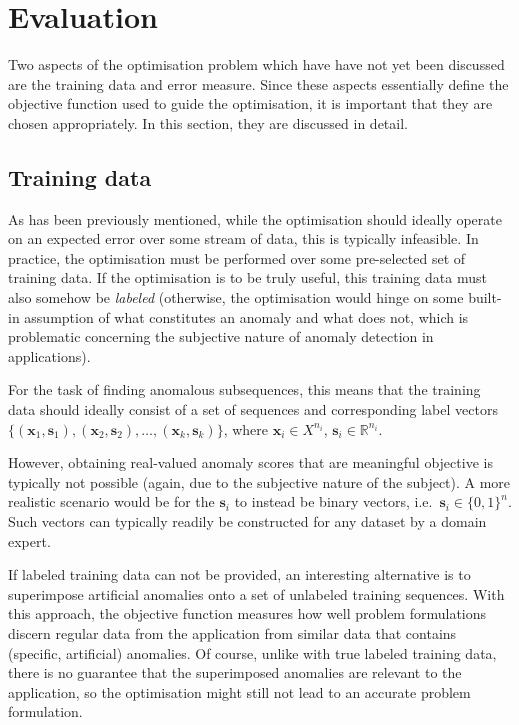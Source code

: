 \section{Evaluation}
\label{ch:evaluation}

Two aspects of the optimisation problem which have have not yet been discussed are the training data and error measure. Since these aspects essentially define the objective function used to guide the optimisation, it is important that they are chosen appropriately. In this section, they are discussed in detail.

\subsection{Training data}
\label{sect:evaluation_data}

As has been previously mentioned, while the optimisation should ideally operate on an expected error over some stream of data, this is typically infeasible. In practice, the optimisation must be performed over some pre-selected set of training data. If the optimisation is to be truly useful, this training data must also somehow be \emph{labeled} (otherwise, the optimisation would hinge on some built-in assumption of what constitutes an anomaly and what does not, which is problematic concerning the subjective nature of anomaly detection in applications).

For the task of finding anomalous subsequences, this means that the training data should ideally consist of a set of sequences and corresponding label vectors $\{(\mathbf{x}_1, \mathbf{s}_1), (\mathbf{x}_2, \mathbf{s}_2), \dots, (\mathbf{x}_k, \mathbf{s}_k)\}$, where $\mathbf{x}_i \in X^{n_i}$, $\mathbf{s}_i \in \mathbb{R}^{n_i}$.

However, obtaining real-valued anomaly scores that are meaningful objective is typically not possible (again, due to the subjective nature of the subject). A more realistic scenario would be for the $\mathbf{s}_i$ to instead be binary vectors, i.e.\ $\mathbf{s}_i \in {\{0,1\}}^n$. Such vectors can typically readily be constructed for any dataset by a domain expert.

If labeled training data can not be provided, an interesting alternative is to superimpose artificial anomalies onto a set of unlabeled training sequences. With this approach, the objective function measures how well problem formulations discern regular data from the application from similar data that contains (specific, artificial) anomalies. Of course, unlike with true labeled training data, there is no guarantee that the superimposed anomalies are relevant to the application, so the optimisation might still not lead to an accurate problem formulation.


